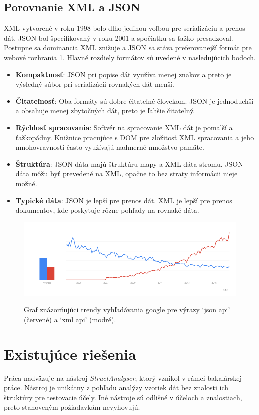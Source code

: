 \subsection*{Porovnanie XML a JSON}
XML vytvorené v roku 1998 bolo dlho jedinou voľbou pre serializáciu a prenos dát. JSON bol špecifikovaný v roku 2001 a spočiatku sa ťažko presadzoval. Postupne sa dominancia XML znižuje a JSON sa stáva preferovanejší formát pre webové rozhrania \ref{xml_vs_json_img}. Hlavné rozdiely formátov sú uvedené v nasledujúcich bodoch.
\begin{itemize}
	\item{\textbf{Kompaktnosť}: JSON pri popise dát využíva menej znakov a preto je výsledný súbor pri serializácii rovnakých dát menší.
	}	
	\item{\textbf{Čitateľnosť}: Oba formáty sú dobre čitateľné človekom. JSON je jednoduchší a obsahuje menej zbytočných dát, preto je ľahšie čitateľný.
	}
	\item{\textbf{Rýchlosť spracovania}: Softvér na spracovanie XML dát je pomalší a ťažkopádny. Knižnice pracujúce s DOM pre zložitosť XML spracovania a jeho mnohovravnosti často využívajú nadmerné množstvo pamäte.
	}
	\item{\textbf{Štruktúra}: JSON dáta majú štruktúru mapy a XML dáta stromu. JSON dáta môžu byť prevedené na XML, opačne to bez straty informácii nieje možné.
	}	
	\item{\textbf{Typické dáta}: JSON je lepší pre prenos dát. XML je lepší pre prenos dokumentov, kde poskytuje rôzne pohľady na rovnaké dáta.
	}	
\end{itemize}   
\begin{figure}[h]\centering
	\centering
	\includegraphics[width=\textwidth,height=\textheight,keepaspectratio]{obrazky-figures/xml_vs_json.png}\\[1pt]
	\caption{Graf znázorňujúci trendy vyhľadávania google pre výrazy  ‘json api’ (červené) a ‘xml api’ (modré).\cite{XMLvsJSONusage}}
	\label{xml_vs_json_img}
\end{figure} 
\section{Existujúce riešenia}
Práca nadväzuje na nástroj \textit{StructAnalyser}, ktorý vznikol v rámci bakalárskej práce. Nástroj je unikátny z pohľadu analýzy vzoriek dát bez znalosti ich štruktúry pre testovacie účely. Iné nástroje sú odlišné v účeloch a znalostiach, preto stanoveným požiadavkám nevyhovujú. 

